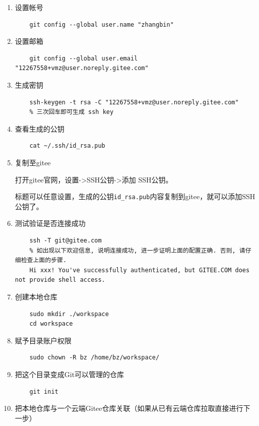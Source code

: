 \begin{enumerate}
  \item 设置帐号
  
  \begin{lstlisting}
    git config --global user.name "zhangbin"
  \end{lstlisting}
  \item 设置邮箱
  
  \begin{lstlisting}
    git config --global user.email "12267558+vmz@user.noreply.gitee.com"
  \end{lstlisting}
  \item 生成密钥
  
  \begin{lstlisting}
    ssh-keygen -t rsa -C "12267558+vmz@user.noreply.gitee.com"
    % 三次回车即可生成 ssh key
  \end{lstlisting}
  \item 查看生成的公钥
  
\begin{lstlisting}
    cat ~/.ssh/id_rsa.pub
\end{lstlisting}
  \item 复制至gitee
  
  打开gitee官网，设置->SSH公钥->添加 SSH公钥。

  标题可以任意设置，生成的公钥\verb|id_rsa.pub|内容复制到gitee，就可以添加SSH公钥了。
  \item 测试验证是否连接成功
  
  \begin{lstlisting}
    ssh -T git@gitee.com
    % 如出现以下欢迎信息, 说明连接成功, 进一步证明上面的配置正确. 否则, 请仔细检查上面的步骤.
    Hi xxx! You've successfully authenticated, but GITEE.COM does not provide shell access.
  \end{lstlisting}
  \item 创建本地仓库
  
  \begin{lstlisting}
    sudo mkdir ./workspace
    cd workspace
  \end{lstlisting}
  \item 赋予目录账户权限
  
  \begin{lstlisting}
    sudo chown -R bz /home/bz/workspace/
  \end{lstlisting}
  \item 把这个目录变成Git可以管理的仓库
  
  \begin{lstlisting}
    git init
  \end{lstlisting}
  \item 把本地仓库与一个云端Gitee仓库关联（如果从已有云端仓库拉取直接进行下一步）
  

\end{enumerate}
